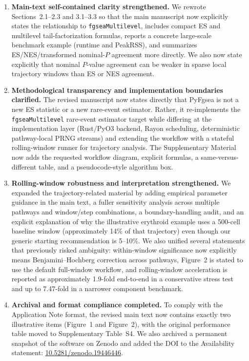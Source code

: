 \documentclass[11pt]{article}
\begin{document}
\begin{enumerate}[leftmargin=1.5em]
\item \textbf{Main-text self-contained clarity strengthened.} We rewrote Sections~2.1--2.3 and 3.1--3.3 so that the main manuscript now explicitly states the relationship to \texttt{fgseaMultilevel}, includes compact ES and multilevel tail-factorization formulas, reports a concrete large-scale benchmark example (runtime and PeakRSS), and summarizes ES/NES/transformed nominal-$P$ agreement more directly. We also now state explicitly that nominal $P$-value agreement can be weaker in sparse local trajectory windows than ES or NES agreement.

\item \textbf{Methodological transparency and implementation boundaries clarified.} The revised manuscript now states directly that PyFgsea is not a new ES statistic or a new rare-event estimator. Rather, it re-implements the \texttt{fgseaMultilevel} rare-event estimator target while differing at the implementation layer (Rust/PyO3 backend, Rayon scheduling, deterministic pathway-local PRNG streams) and extending the workflow with a stateful rolling-window runner for trajectory analysis. The Supplementary Material now adds the requested workflow diagram, explicit formulas, a same-versus-different table, and a pseudocode-style algorithm box.

\item \textbf{Rolling-window robustness and interpretation strengthened.} We expanded the trajectory-related material by adding empirical parameter guidance in the main text, a fuller sensitivity analysis across multiple pathways and window/step combinations, a boundary-handling audit, and an explicit explanation of why the illustrative erythroid example uses a 500-cell baseline window (approximately 14\% of that trajectory) even though our generic starting recommendation is 5--10\%. We also unified several statements that previously risked ambiguity: within-window significance now explicitly means Benjamini--Hochberg correction across pathways, Figure~2 is stated to use the default full-window workflow, and rolling-window acceleration is reported as approximately 1.9-fold end-to-end in a conservative stress test and up to 7.47-fold in a narrower component benchmark.

\item \textbf{Archival and format compliance completed.} To comply with the Application Note format, the revised main text now contains exactly two illustrative items (Figure~1 and Figure~2), with the original performance table moved to Supplementary Table~S4. We also archived a permanent snapshot of the software on Zenodo and added the DOI to the Availability statement: \href{https://doi.org/10.5281/zenodo.19446446}{10.5281/zenodo.19446446}.
\end{enumerate}
\end{document}
